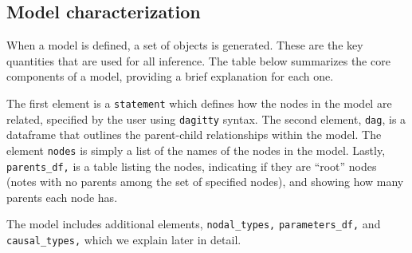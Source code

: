 \documentclass[
  11pt,
  article]{jss}
\begin{document}
\hypertarget{model-characterization}{%
\subsection{Model characterization}\label{model-characterization}}

When a model is defined, a set of objects is generated. These are the
key quantities that are used for all inference. The table below
summarizes the core components of a model, providing a brief explanation
for each one.

The first element is a \texttt{statement} which defines how the nodes in
the model are related, specified by the user using \texttt{dagitty}
syntax. The second element, \texttt{dag}, is a dataframe that outlines
the parent-child relationships within the model. The element
\texttt{nodes} is simply a list of the names of the nodes in the model.
Lastly, \texttt{parents\_df,} is a table listing the nodes, indicating
if they are ``root'' nodes (notes with no parents among the set of
specified nodes), and showing how many parents each node has.

The model includes additional elements, \texttt{nodal\_types,}
\texttt{parameters\_df,} and \texttt{causal\_types,} which we explain
later in detail.
\end{document}
